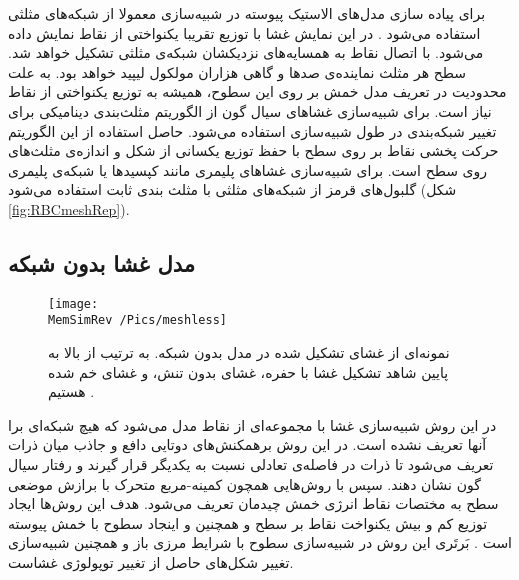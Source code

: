 برای پیاد‌ه سازی مدل‌های الاستیک پیوسته در شبیه‌سازی معمولا از شبکه‌های مثلثی استفاده می‌شود 
\cite{Gompper1997, NelsonBook2004}.
در این نمایش  غشا با توزیع تقریبا یکنواختی از نقاط نمایش داده می‌شود. با اتصال نقاط به همسایه‌های نزدیکشان شبکه‌ی مثلثی تشکیل خواهد شد. سطح هر مثلث نماینده‌ی صدها و گاهی هزاران مولکول لیپید خواهد بود. به علت محدودیت در تعریف مدل خمش بر روی این سطوح، همیشه به توزیع یکنواختی از نقاط نیاز است. برای شبیه‌سازی غشاهای سیال گون  از الگوریتم مثلث‌بندی دینامیکی
\cite{Boal1992PRA, Gompper1992Science}
برای تغییر شبکه‌بندی در طول شبیه‌سازی استفاده می‌شود. حاصل استفاده از این الگوریتم حرکت پخشی
 نقاط بر روی سطح با حفظ توزیع یکسانی از شکل و اندازه‌ی مثلث‌های روی سطح است. برای شبیه‌سازی غشاهای پلیمری مانند کپسیدها
 یا شبکه‌ی پلیمری گلبول‌های قرمز از شبکه‌های مثلثی با مثلث بندی ثابت استفاده می‌شود (شکل 
 \ref{fig:RBCmeshRep}).

\subsection{
 مدل غشا بدون شبکه‌
 }
\begin{figure}[h]
\begin{center}
\texttt{[image: \\MemSimRev /Pics/meshless]}
\caption{
نمونه‌ای از غشای تشکیل شده در مدل بدون شبکه. به ترتیب از بالا به پایین شاهد تشکیل غشا با حفره، غشای بدون تنش، و غشای خم شده هستیم
\cite{Noguchi2006PRE}.
}
\label{fig:meshless}
\end{center}
\end{figure}
در این روش شبیه‌سازی غشا با مجموعه‌ای از نقاط مدل می‌شود که هیچ شبکه‌ای برا آنها تعریف نشده است. در این روش برهمکنش‌های دوتایی دافع و جاذب میان ذرات تعریف می‌شود تا ذرات در فاصله‌ی تعادلی نسبت به یکدیگر قرار گیرند و رفتار سیال گون نشان دهند. سپس با روش‌هایی همچون کمینه-مربع متحرک
با برازش
 موضعی سطح به مختصات نقاط انرژی خمش چیدمان تعریف می‌شود. هدف این روش‌ها ایجاد  توزیع کم و بیش یکنواخت نقاط بر سطح و همچنین و اینجاد سطوح با خمش پیوسته
است
\cite{Noguchi2006PRE}.
بَرتَری این روش در شبیه‌سازی سطوح با شرایط مرزی باز و همچنین شبیه‌سازی تغییر شکل‌های حاصل از تغییر توپولوژی غشاست.








